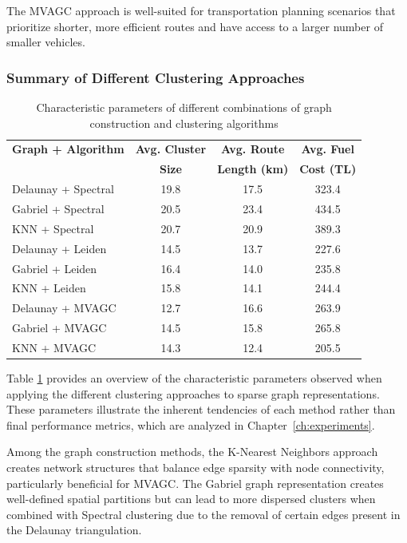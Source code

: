 The MVAGC approach is well-suited for transportation planning scenarios that prioritize shorter, more efficient routes and have access to a larger number of smaller vehicles.

\subsubsection{Summary of Different Clustering Approaches}
\label{subsubsec:clustering_comparison}

\begin{table}[h]
\centering
\begin{tabular}{|l|c|c|c|}
\hline
\textbf{Graph + Algorithm} & \textbf{Avg. Cluster} & \textbf{Avg. Route} & \textbf{Avg. Fuel} \\
 & \textbf{Size} & \textbf{Length (km)} & \textbf{Cost (TL)} \\
\hline
Delaunay + Spectral & 19.8 & 17.5 & 323.4 \\
\hline
Gabriel + Spectral & 20.5 & 23.4 & 434.5 \\
\hline
KNN + Spectral & 20.7 & 20.9 & 389.3 \\
\hline
Delaunay + Leiden & 14.5 & 13.7 & 227.6 \\
\hline
Gabriel + Leiden & 16.4 & 14.0 & 235.8 \\
\hline
KNN + Leiden & 15.8 & 14.1 & 244.4 \\
\hline
Delaunay + MVAGC & 12.7 & 16.6 & 263.9 \\
\hline
Gabriel + MVAGC & 14.5 & 15.8 & 265.8 \\
\hline
KNN + MVAGC & 14.3 & 12.4 & 205.5 \\
\hline
\end{tabular}
\caption{Characteristic parameters of different combinations of graph construction and clustering algorithms}
\label{tab:sparse_clustering_comparison}
\end{table}

Table \ref{tab:sparse_clustering_comparison} provides an overview of the characteristic parameters observed when applying the different clustering approaches to sparse graph representations. These parameters illustrate the inherent tendencies of each method rather than final performance metrics, which are analyzed in Chapter~\ref{ch:experiments}.

Among the graph construction methods, the K-Nearest Neighbors approach creates network structures that balance edge sparsity with node connectivity, particularly beneficial for MVAGC. The Gabriel graph representation creates well-defined spatial partitions but can lead to more dispersed clusters when combined with Spectral clustering due to the removal of certain edges present in the Delaunay triangulation.


